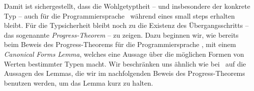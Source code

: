 
Damit ist sichergestellt, dass die Wohlgetyptheit -- und insbesondere der konkrete Typ -- auch f\"ur die
Programmiersprache \Losub\ w\"ahrend eines small steps erhalten bleibt. F\"ur die Typsicherheit bleibt
noch zu die Existenz des \"Ubergangsschritts -- das sogenannte {\em Progress-Theorem} -- zu zeigen. Dazu
beginnen wir, wie bereits beim Beweis des Progress-Theorems f\"ur die Programmiersprache \Lot, mit einem
{\em Canonical Forms Lemma}, welches eine Aussage \"uber die m\"oglichen Formen von Werten bestimmter
Typen macht. Wir beschr\"anken uns \"ahnlich wie bei \Lot\ auf die Aussagen des Lemmas, die wir im
nachfolgenden Beweis des Progress-Theorems benutzen werden, um das Lemma kurz zu halten.

